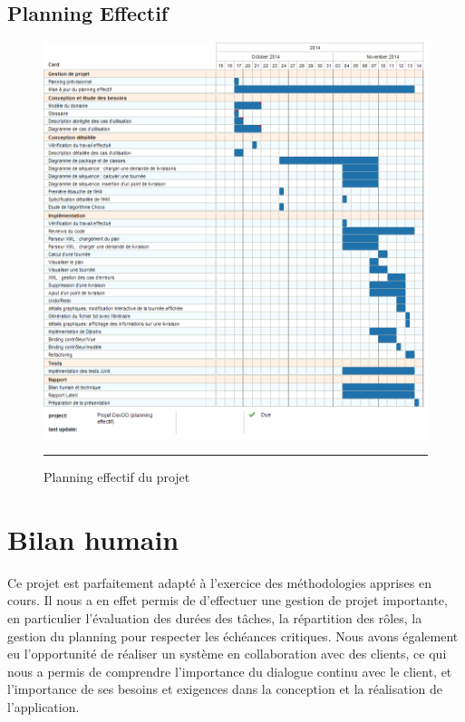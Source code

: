 \subsection{Planning Effectif}
\begin{figure}[htbp]
	\centering
		\includegraphics[width=\textwidth,height=\textheight,keepaspectratio]{Figures/effective_plan}
		\rule{35em}{0.5pt}
	\caption[Planning effectif du projet]{Planning effectif du projet}
\end{figure}
\clearpage


\section{Bilan humain}

Ce projet est parfaitement adapté à l'exercice des méthodologies apprises en cours. Il nous a en effet permis de d'effectuer une gestion de projet importante, en particulier l'évaluation des durées des tâches, la répartition des rôles, la gestion du planning pour respecter les échéances critiques.
Nous avons également eu l'opportunité de réaliser un système en collaboration avec des clients, ce qui nous a permis de comprendre l'importance du dialogue continu avec le client, et l'importance de ses besoins et exigences dans la conception et la réalisation de l'application. 

